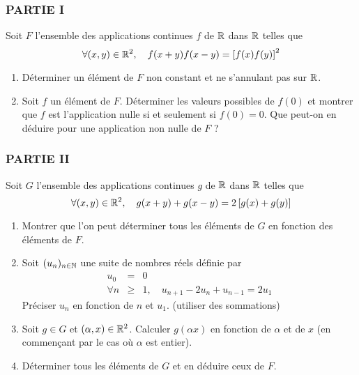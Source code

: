 \subsubsection*{PARTIE I}

Soit $F$ l'ensemble des applications continues $f$ de $\mathbb{R}$ dans $%
\R$ telles que
\[
\forall (x,y)\in \mathbb{R}^{2},\quad f(x+y)f(x-y)=\left[
f(x)f(y)\right] ^{2}
\]

\begin{enumerate}
\item  D{\'e}terminer un {\'e}l{\'e}ment de $F$ non constant et ne
s'annulant pas sur $\mathbb{R}$.

\item  Soit $f$ un {\'e}l{\'e}ment de $F$. D{\'e}terminer les valeurs
possibles de $f(0)$ et montrer que $f$ est l'application nulle si et
seulement si $f(0)=0$. Que peut-on en d{\'e}duire pour une application non
nulle de $F$ ?
\end{enumerate}

\subsubsection*{PARTIE II}

Soit $G$ l'ensemble des applications continues $g$ de $\mathbb{R}$ dans $%
\R$ telles que
\[
\forall (x,y)\in \mathbb{R}^{2},\quad g(x+y)+g(x-y)=2\left[
g(x)+g(y)\right]
\]

\begin{enumerate}
\item  Montrer que l'on peut d{\'e}terminer tous les {\'e}l{\'e}ments de $G$
en fonction des {\'e}l{\'e}ments de $F.$

\item  Soit $(u_{n})_{n\in \mathbb{N}}$ une suite de nombres r{\'e}els
d{\'e}finie par
\begin{eqnarray*}
u_{0} &=&0 \\
\forall n &\geq &1,\quad u_{n+1}-2u_{n}+u_{n-1}=2u_{1}
\end{eqnarray*}
Pr{\'e}ciser $u_{n}$ en fonction de $n$ et $u_{1}$. (utiliser des sommations)

\item  Soit $g\in G$ et $(\alpha ,x)\in \mathbb{R}^{2}$. Calculer $g(\alpha
x)$ en fonction de $\alpha $ et de $x$ (en commen\c{c}ant par le cas o{\`u} $%
\alpha $ est entier).

\item  D{\'e}terminer tous les {\'e}l{\'e}ments de $G$ et en d{\'e}duire
ceux de $F$.
\end{enumerate}

